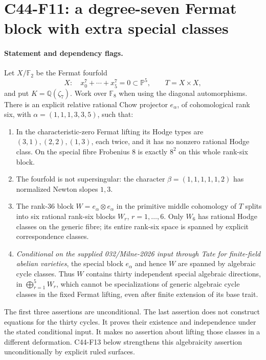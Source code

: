 \documentclass[11pt]{article}
\theoremstyle{remark}\newtheorem{remark}[theorem]{Remark}
\begin{document}

\section{C44-F11: a degree-seven Fermat block with extra special classes}
\label{sec:C44-F11}
\paragraph{Statement and dependency flags.}
Let \(X/\mathbb F _2\) be the Fermat fourfold
\[
 X:\quad x_0^7+\cdots+x_5^7=0\subset\mathbb P^5,\qquad T=X\times X,
\]
and put \(K=\mathbb Q(\zeta _7)\). Work over \(\mathbb F _8\) when using
the diagonal automorphisms. There is an explicit relative rational Chow
projector \(e_\alpha\), of cohomological rank six, with
\(\alpha=(1,1,1,3,3,5)\), such that:
\begin{enumerate}
\item In the characteristic-zero Fermat lifting its Hodge types are
\((3,1),(2,2),(1,3)\), each twice, and it has no nonzero rational Hodge
class. On the special fibre Frobenius \(8\) is exactly \(8^2\) on this
whole rank-six block.
\item The fourfold is not supersingular: the character
\(\beta=(1,1,1,1,1,2)\) has normalized Newton slopes \(1,3\).
\item The rank-36 block \(W=e_\alpha\otimes e_\alpha\) in the primitive
middle cohomology of \(T\) splits into six rational rank-six blocks
\(W_r\), \(r=1,\ldots,6\). Only \(W_6\) has rational Hodge classes on the
generic fibre; its entire rank-six space is spanned by explicit
correspondence classes.
\item \emph{Conditional on the supplied 032/Milne-2026 input through
Tate for finite-field abelian varieties}, the special block \(e_\alpha\)
and hence \(W\) are spanned by algebraic cycle classes. Thus \(W\)
contains thirty independent special algebraic directions, in
\(\bigoplus_{r=1}^5W_r\), which cannot be specializations of generic
algebraic cycle classes in the fixed Fermat lifting, even after finite
extension of its base trait.
\end{enumerate}
The first three assertions are unconditional. The last assertion does
not construct equations for the thirty cycles. It proves their
existence and independence under the stated conditional input. It makes
no assertion about lifting those classes in a different deformation.
C44-F13 below strengthens this algebraicity assertion unconditionally
by explicit ruled surfaces.
\end{document}
